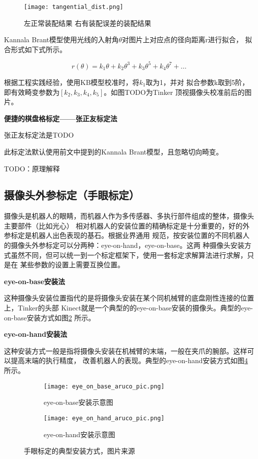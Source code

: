 \begin{figure}[h] %
  \centering
  \texttt{[image: tangential\_dist.png]}
  \caption{左正常装配结果 右有装配误差的装配结果}
  \label{fig:tangential_distort}
\end{figure}

Kannala Brant模型使用光线的入射角$\theta$对图片上对应点的径向距离r进行拟合，
拟合形式如下式所示。

\begin{equation}
  r(\theta) = k_1\theta + k_2\theta^{3} + k_3\theta^{5} + k_4\theta^{7} + ...
\end{equation}

根据工程实践经验，使用KB模型校准时，将$k_1$取为1，并对
拟合参数{k}取到5阶，即有效畸变参数为$[k_2, k_3, k_4, k_5]$。如图TODO为Tinker
顶视摄像头校准前后的图片。

\noindent \textbf{便捷的棋盘格标定——张正友标定法}

张正友标定法是TODO

此标定法默认使用前文中提到的Kannala Brant模型，且忽略切向畸变。

TODO：原理解释

\subsection{摄像头外参标定（手眼标定）}

摄像头是机器人的眼睛，而机器人作为多传感器、多执行部件组成的整体，摄像头主要部件（比如光心）
相对机器人的安装位置的精确标定是十分重要的，好的外参标定是机器人出色表现的基石。根据业界通用
规范，按安装位置的不同机器人的摄像头外参标定可以分两种：eye-on-hand，eye-on-base。这两
种摄像头安装方式虽然不同，但可以统一到一个标定框架下，使用一套标定求解算法进行求解，只是在
某些参数的设置上需要互换位置。

\noindent \textbf{eye-on-base安装法}

这种摄像头安装位置指代的是将摄像头安装在某个同机械臂的底盘刚性连接的位置上，Tinker的头部
Kinect就是一个典型的的eye-on-base安装的摄像头。典型的eye-on-base安装方式如图\ref{fig:eye_on_base}
所示。

\noindent \textbf{eye-on-hand安装法}

这种安装方式一般是指将摄像头安装在机械臂的末端，一般在夹爪的腕部。这样可以提高末端的执行精度，
改善机器人的表现。典型的eye-on-hand安装方式如图\ref{fig:eye_on_hand}所示。

\begin{figure}
\centering
\begin{subfigure}{.5\textwidth}
  \centering
  \texttt{[image: eye\_on\_base\_aruco\_pic.png]}
  \caption{eye-on-base安装示意图}
  \label{fig:eye_on_base}
\end{subfigure}%
\begin{subfigure}{.5\textwidth}
  \centering
  \texttt{[image: eye\_on\_hand\_aruco\_pic.png]}
  \caption{eye-on-hand安装示意图}
  \label{fig:eye_on_hand}
\end{subfigure}
\caption{手眼标定的典型安装方式，图片来源\cite{easy_handeye}}
\end{figure}


